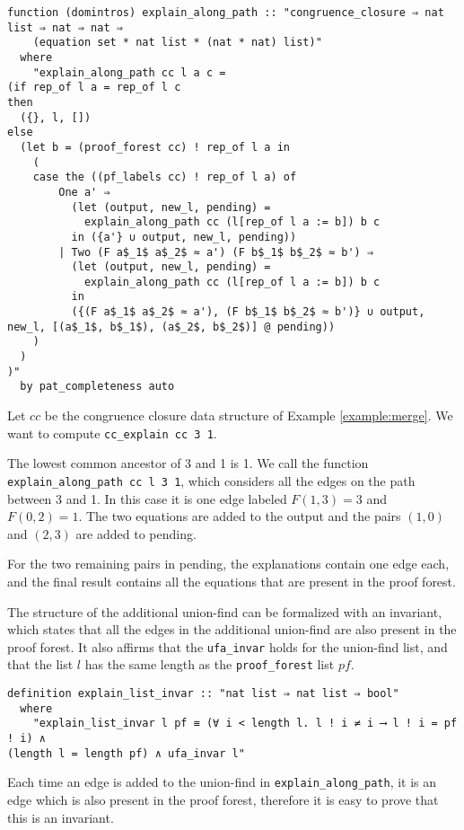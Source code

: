 \begin{lstlisting}
function (domintros) explain_along_path :: "congruence_closure ⇒ nat list ⇒ nat ⇒ nat ⇒
    (equation set * nat list * (nat * nat) list)"
  where
    "explain_along_path cc l a c =
(if rep_of l a = rep_of l c
then
  ({}, l, [])
else
  (let b = (proof_forest cc) ! rep_of l a in
    (
    case the ((pf_labels cc) ! rep_of l a) of
        One a' ⇒
          (let (output, new_l, pending) =
            explain_along_path cc (l[rep_of l a := b]) b c
          in ({a'} ∪ output, new_l, pending))
        | Two (F a$_1$ a$_2$ ≈ a') (F b$_1$ b$_2$ ≈ b') ⇒
          (let (output, new_l, pending) =
            explain_along_path cc (l[rep_of l a := b]) b c
          in
          ({(F a$_1$ a$_2$ ≈ a'), (F b$_1$ b$_2$ ≈ b')} ∪ output, new_l, [(a$_1$, b$_1$), (a$_2$, b$_2$)] @ pending))
    )
  )
)"
  by pat_completeness auto
\end{lstlisting}

\begin{exmp}
Let $cc$ be the congruence closure data structure of Example \ref{example:merge}. We want to compute \lstinline|cc_explain cc 3 1|.

The lowest common ancestor of 3 and 1 is 1. We call the function \lstinline{explain_along_path cc l 3 1}, which considers all the edges on the path between 3 and 1. In this case it is one edge labeled $F (1,3) = 3$ and $F(0,2) = 1$. The two equations are added to the output and the pairs $(1,0)$ and $(2,3)$ are added to pending.

For the two remaining pairs in pending, the explanations contain one edge each, and the final result contains all the equations that are present in the proof forest.
\end{exmp}


The structure of the additional union-find can be formalized with an invariant, which states that all the edges in the additional union-find are also present in the proof forest. It also affirms that the \lstinline{ufa_invar} holds for the union-find list, and that the list $l$ has the same length as the \lstinline{proof_forest} list $pf$.

\begin{lstlisting}
definition explain_list_invar :: "nat list ⇒ nat list ⇒ bool"
  where
    "explain_list_invar l pf ≡ (∀ i < length l. l ! i ≠ i ⟶ l ! i = pf ! i) ∧
(length l = length pf) ∧ ufa_invar l"
\end{lstlisting}

Each time an edge is added to the union-find in \lstinline{explain_along_path}, it is an edge which is also present in the proof forest, therefore it is easy to prove that this is an invariant.

